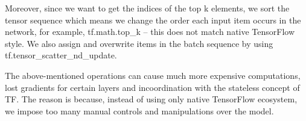 Moreover, since we want to get the indices of the top k elements, we sort the tensor sequence which means we change the order each input item occurs in the network, for example, tf.math.top\_k -- this does not match native TensorFlow style. We also assign and overwrite items in the batch sequence by using tf.tensor\_scatter\_nd\_update. 

The above-mentioned operations can cause much more expensive computations, lost gradients for certain layers and incoordination with the stateless concept of TF. The reason is because, instead of using only native TensorFlow ecosystem, we impose too many manual controls and manipulations over the model.

